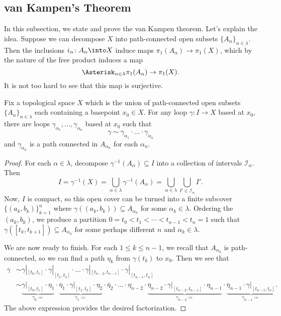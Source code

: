 \documentclass[../notes.tex]{subfiles}
\begin{document}
\subsection{van Kampen's Theorem}
In this subsection, we state and prove the van Kampen theorem. Let's explain the idea. Suppose we can decompose $X$ into path-connected open subsets $\{A_\alpha\}_{\alpha\in\lambda}$. Then the inclusions $i_\alpha\colon A_\alpha\into X$ induce maps $\pi_1(A_\alpha)\to\pi_1(X)$, which by the nature of the free product induces a map
\[\Asterisk_{\alpha\in\lambda}\pi_1(A_\alpha)\to\pi_1(X).\]
It is not too hard to see that this map is surjective.
\begin{lemma} \label{lem:free-group-covers-pi1}
	Fix a topological space $X$ which is the union of path-connected open subsets $\{A_\alpha\}_{\alpha\in\lambda}$ each containing a basepoint $x_0\in X$. For any loop $\gamma\colon I\to X$ based at $x_0$, there are loops $\gamma_{\alpha_1},\ldots,\gamma_{\alpha_n}$ based at $x_0$ such that
	\[\gamma\sim\gamma_{\alpha_1}\cdot\ldots\cdot\gamma_{\alpha_n}\]
	and $\gamma_{\alpha_n}$ is a path connected in $A_{\alpha_n}$ for each $\alpha_n$.
\end{lemma}
\begin{proof}
	For each $\alpha\in\lambda$, decompose $\gamma^{-1}(A_\alpha)\subseteq I$ into a collection of intervals $\mathcal I_\alpha$. Then
	\[I=\gamma^{-1}(X)=\bigcup_{\alpha\in\lambda}\gamma^{-1}(A_\alpha)=\bigcup_{\alpha\in\lambda}\bigcup_{I'\in\mathcal I_\alpha}I'.\]
	Now, $I$ is compact, so this open cover can be turned into a finite subcover $\{(a_k,b_k)\}_{k=1}^n$ where $\gamma((a_k,b_k))\subseteq A_{\alpha_k}$ for some $\alpha_k\in\lambda$. Ordering the $(a_k,b_k)$, we produce a partition $0=t_0<t_1<\cdots<t_{n-1}<t_n=1$ such that $\gamma([t_k,t_{k+1}])\subseteq A_{\alpha_k}$ for some perhaps different $n$ and $\alpha_k\in\lambda$.

	We are now ready to finish. For each $1\le k\le n-1$, we recall that $A_{\alpha_k}$ is path-connected, so we can find a path $\eta_k$ from $\gamma(t_k)$ to $x_0$. Then we see that
	\begin{align*}
		\gamma &\sim \gamma|_{[t_0,t_1]}\cdot\gamma|_{[t_1,t_2]}\cdot\ldots\cdot\gamma|_{[t_{n-2},t_{n-1}]}\cdot\gamma|_{[t_{n-1},t_n]} \\
		&\sim \underbrace{\gamma|_{[t_0,t_1]}\cdot\eta_1}_{\gamma_0\coloneqq}\cdot\underbrace{\overline\eta_1\cdot\gamma|_{[t_1,t_2]}\cdot\eta_2}_{\gamma_1\coloneqq}\cdot\overline\eta_2\cdot\ldots\cdot\eta_{n-2}\cdot\underbrace{\overline\eta_{n-2}\cdot\gamma|_{[t_{n-2},t_{n-1}]}\cdot\eta_{n-1}}_{\gamma_{n-2}\coloneqq}\cdot\underbrace{\overline\eta_{n-1}\cdot\gamma|_{[t_{n-1},t_n]}}_{\gamma_{n-1}\coloneqq}.
	\end{align*}
	The above expression provides the desired factorization.
\end{proof}
\end{document}
